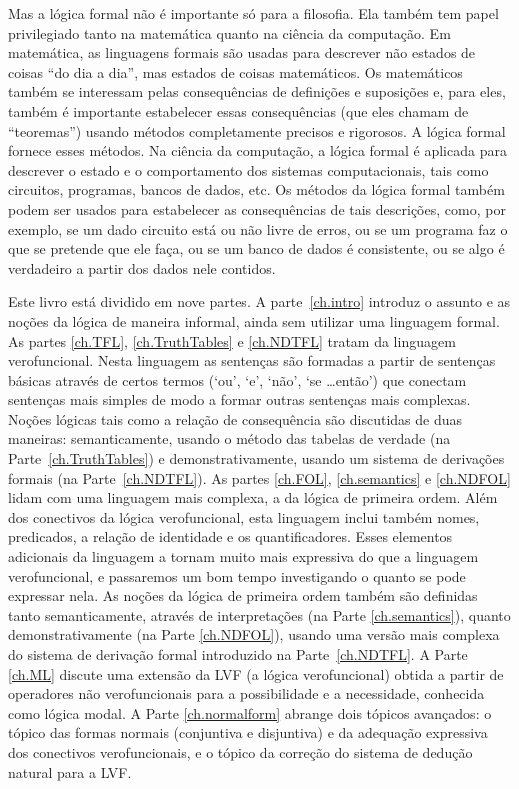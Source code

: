 

Mas a lógica formal não é importante só para a filosofia.
Ela também tem papel privilegiado tanto na matemática quanto na ciência da computação.
Em matemática, as linguagens formais são usadas para descrever não estados de coisas ``do dia a dia'', mas estados de coisas matemáticos.
Os matemáticos também se interessam pelas consequências de definições e suposições e, para eles, também é importante estabelecer essas consequências (que eles chamam de ``teoremas'') usando métodos completamente precisos e rigorosos.
A lógica formal fornece esses métodos.
Na ciência da computação, a lógica formal é aplicada para descrever o estado e o comportamento dos sistemas computacionais, tais como circuitos, programas, bancos de dados, etc.
Os métodos da lógica formal também podem ser usados para estabelecer as consequências de tais descrições, como, por exemplo, se um dado circuito está ou não livre de erros, ou se um programa faz o que se pretende que ele faça, ou se um banco de dados é consistente, ou se algo é verdadeiro a partir dos dados nele contidos.

Este livro está dividido em nove partes.
A parte~\ref{ch.intro} introduz o assunto e as noções da lógica de maneira informal, ainda sem utilizar uma linguagem formal.
As partes \ref{ch.TFL}, \ref{ch.TruthTables} e \ref{ch.NDTFL} tratam da linguagem verofuncional.  Nesta linguagem as sentenças são formadas a partir de sentenças básicas através de certos termos (`ou', `e', `não', `se \dots então') que conectam sentenças mais simples de modo a formar outras sentenças mais complexas.
Noções lógicas tais como a relação de consequência são discutidas de duas maneiras:
semanticamente, usando o método das tabelas de verdade (na Parte~\ref{ch.TruthTables}) e demonstrativamente, usando um sistema de derivações formais (na Parte~\ref{ch.NDTFL}).
As partes \ref{ch.FOL}, \ref{ch.semantics} e \ref{ch.NDFOL} lidam com uma linguagem mais complexa, a da lógica de primeira ordem.
Além dos conectivos da lógica verofuncional, esta linguagem inclui também nomes, predicados, a relação de identidade e os quantificadores.
Esses elementos adicionais da linguagem a tornam muito mais expressiva do que a linguagem verofuncional, e passaremos um bom tempo investigando o quanto se pode expressar nela.
As noções da lógica de primeira ordem também são definidas tanto semanticamente, através de interpretações (na Parte \ref{ch.semantics}), quanto demonstrativamente (na Parte \ref{ch.NDFOL}), usando uma versão mais complexa do sistema de derivação formal introduzido na Parte~\ref{ch.NDTFL}.
A Parte \ref{ch.ML} discute uma extensão da LVF (a lógica verofuncional) obtida a partir de operadores não verofuncionais para a possibilidade e a necessidade, conhecida como lógica modal.
A Parte \ref{ch.normalform} abrange dois tópicos avançados:
o tópico das formas normais (conjuntiva e disjuntiva) e da adequação expressiva dos conectivos verofuncionais, e o tópico da correção do sistema de dedução natural para a LVF.


